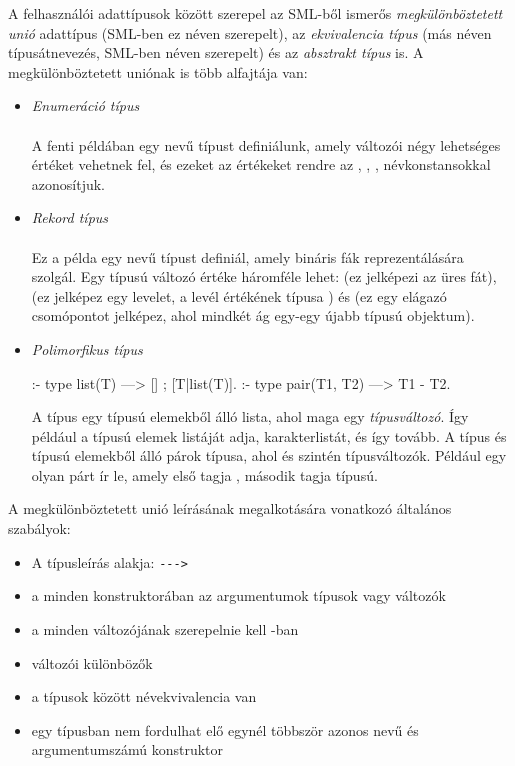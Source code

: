 A felhasználói adattípusok között szerepel az SML-ből ismerős \emph{megkülönböztetett
unió} adattípus (SML-ben ez  néven szerepelt), az \emph{ekvivalencia típus}
(más néven típusátnevezés, SML-ben  néven szerepelt) és az
\emph{absztrakt típus} is. A megkülönböztetett uniónak is több alfajtája van:

\begin{itemize}
\item \emph{Enumeráció típus} \\
 \\
A fenti példában egy  nevű típust definiálunk, amely változói négy lehetséges
értéket vehetnek fel, és ezeket az értékeket rendre az , ,
,  névkonstansokkal azonosítjuk.
\item \emph{Rekord típus} \\
 \\
Ez a példa egy  nevű típust definiál, amely bináris fák reprezentálására
szolgál. Egy  típusú változó értéke háromféle lehet:  (ez
jelképezi az üres fát),  (ez jelképez egy levelet, a levél értékének
típusa ) és  (ez egy elágazó csomópontot jelképez,
ahol mindkét ág egy-egy újabb  típusú objektum).
\item \emph{Polimorfikus típus} \\
\begin{prologcode}
:- type list(T) ---> [] ; [T|list(T)].
:- type pair(T1, T2) ---> T1 - T2.
\end{prologcode}
A  típus egy  típusú elemekből álló lista, ahol  maga
egy \emph{típusváltozó}. Így például a   típusú elemek
listáját adja,  karakterlistát, és így tovább. A 
típus  és  típusú elemekből álló párok típusa, ahol  és
 szintén típusváltozók. Például  egy olyan párt ír
le, amely első tagja , második tagja  típusú.
\end{itemize}

A megkülönböztetett unió leírásának megalkotására vonatkozó általános szabályok:

\begin{itemize}
\item A típusleírás alakja:   \verb`--->` 
\item a  minden konstruktorában az argumentumok típusok vagy változók
\item a  minden változójának szerepelnie kell -ban
\item {} változói különbözők
\item a típusok között névekvivalencia van
\item egy típusban nem fordulhat elő egynél többször azonos nevű és
argumentumszámú konstruktor
\end{itemize}

